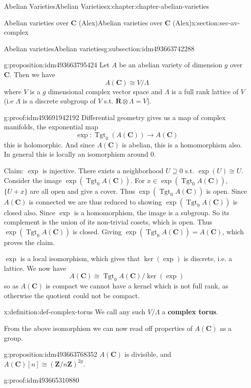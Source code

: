\documentclass[oneside,10pt,]{book}
\newcommand{\terminology}[1]{\textbf{#1}}
\numberwithin{equation}{section}
\newcommand{\lb}{[}
\newcommand{\rb}{]}
\newcommand{\ZZ}{\mathbf{Z}}
\newcommand{\RR}{\mathbf{R}}
\newcommand{\CC}{\mathbf{C}}
\DeclareMathOperator{\Tgt}{Tgt}
\begin{document}
\begin{chapterptx}{Abelian Varieties}{}{Abelian Varieties}{}{}{x:chapter:chapter-abelian-varieties}
\begin{sectionptx}{Abelian varieties over \(\CC\) (Alex)}{}{Abelian varieties over \(\CC\) (Alex)}{}{}{x:section:sec-av-complex}
\begin{subsectionptx}{Abelian varieties}{}{Abelian varieties}{}{}{g:subsection:idm493663742288}
\begin{proposition}{}{}{g:proposition:idm493663795424}
Let \(A\) be an abelian variety of dimension \(g\) over \(\CC\). Then we have%
\begin{equation*}
A(\CC) \cong V/\Lambda
\end{equation*}
where \(V\) is a \(g\) dimensional complex vector space and \(\Lambda\) is a full rank lattice of \(V\) (i.e \(\Lambda\) is a discrete subgroup of \(V\) s.t. \(\RR\otimes \Lambda  = V\)).%
\end{proposition}
\begin{proofptx}{}{g:proof:idm493691942192}
Differential geometry gives us a map of complex manifolds, the exponential map%
\begin{equation*}
\exp\colon\Tgt_0(A(\CC)) \to A(\CC)
\end{equation*}
this is holomorphic. And since \(A(\CC)\) is abelian, this is a homomorphism also. In general this is locally an isomorphism around 0.%
\par
Claim: \(\exp\) is injective. There exists a neighborhood \(U\supseteq 0\) s.t. \(\exp(U) \cong U\). Consider the image \(\exp(\Tgt_0 A(\CC))\). For \(x\in \exp(\Tgt_0 A(\CC))\), \(\{U+x\}\) are all open and give a cover. Thus \(\exp(\Tgt_0A(\CC))\) is open. Since \(A(\CC)\) is connected we are thus reduced to showing \(\exp(\Tgt_0 A(\CC))\) is closed also. Since \(\exp\) is a homomorphism, the image is a subgroup. So its complement is the union of its non-trivial cosets, which is open. Thus \(\exp(\Tgt_0A(\CC))\) is closed. Giving \(\exp(\Tgt_0A(\CC)) = A(\CC)\), which proves the claim.%
\par
\(\exp\) is a local isomorphism, which gives that \(\ker(\exp)\) is discrete, i.e. a lattice. We now have%
\begin{equation*}
A(\CC) \cong \Tgt_0A(\CC)/ \ker(\exp)
\end{equation*}
so as \(A(\CC)\) is compact we cannot have a kernel which is not full rank, as otherwise the quotient could not be compact.%
\end{proofptx}
\begin{definition}{}{x:definition:def-complex-torus}%
We call any such \(V/\Lambda\) a \terminology{complex torus}.%
\end{definition}
From the above isomorphism we can now read off properties of \(A(\CC)\) as a group.%
\begin{proposition}{}{}{g:proposition:idm493663768352}%
\(A(\CC)\) is divisible, and \(A(\CC)\lb n\rb \cong (\ZZ/n\ZZ)^{2g}\).%
\end{proposition}
\begin{proofptx}{}{g:proof:idm493665310880}

\end{proofptx}
\end{subsectionptx}
\end{sectionptx}
\end{chapterptx}
\end{document}
